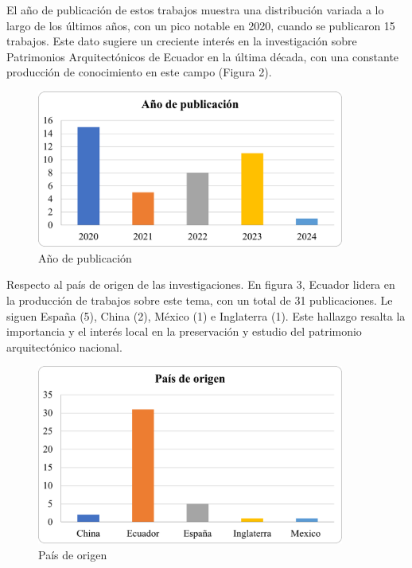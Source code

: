 \documentclass[journal,article,submit,pdftex,moreauthors]{Definitions/mdpi}
\begin{document}
\par %
El año de publicación de estos trabajos muestra una distribución variada a lo largo de los últimos años, con un pico notable en 2020, cuando se publicaron 15 trabajos. Este dato sugiere un creciente interés en la investigación sobre Patrimonios Arquitectónicos de Ecuador en la última década, con una constante producción de conocimiento en este campo (Figura 2). \par %
\begin{figure} [h!]
  \centering
  \includegraphics[width=0.9\textwidth]{Graficos/año de publicación.png}
    \caption{Año de publicación}
  \label{fig:grafico}
\end{figure}  
\par %
Respecto al país de origen de las investigaciones. En figura 3, Ecuador lidera en la producción de trabajos sobre este tema, con un total de 31 publicaciones. Le siguen España (5), China (2), México (1) e Inglaterra (1). Este hallazgo resalta la importancia y el interés local en la preservación y estudio del patrimonio arquitectónico nacional.
\newpage
\par %
  \begin{figure} [h!]
    \centering
    \includegraphics[width=0.9\textwidth]{Graficos/Pais de origen.png }
    \caption{País de origen}
    \label{fig:grafico}
\end{figure}
\par %
 
\end{document}
